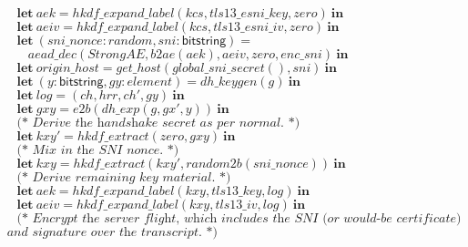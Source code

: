 \documentclass{article}
\theoremstyle{definition}
\newcommand{\kwl}[1]{\mathbf{#1}}
\newcommand{\kwt}[1]{\mathsf{#1}}
\newcommand{\var}[1]{\mathit{#1}}
\theoremstyle{definition}
\begin{document}
\begin{tabbing}
$\ \ \ \ \ \kwl{let}\ \var{aek} = \var{hkdf{\_}expand{\_}label}(\var{kcs}, \var{tls13{\_}esni{\_}key}, \var{zero})\ \kwl{in} $\\
$\ \ \ \ \ \kwl{let}\ \var{aeiv} = \var{hkdf{\_}expand{\_}label}(\var{kcs}, \var{tls13{\_}esni{\_}iv}, \var{zero})\ \kwl{in} $\\
$\ \ \ \ \ \kwl{let}\ (\var{sni{\_}nonce}{:}\var{random}, \var{sni}{:}\kwt{bitstring}) =  $\\
$\ \ \ \ \ \ \ \ \ \var{aead{\_}dec}(\var{StrongAE}, \var{b2ae}(\var{aek}), \var{aeiv}, \var{zero}, \var{enc{\_}sni})\ \kwl{in} $\\
$ $\\
$\ \ \ \ \ \kwl{let}\ \var{origin{\_}host} = \var{get{\_}host}(\var{global{\_}sni{\_}secret}(), \var{sni})\ \kwl{in} $\\
$ $\\
$\ \ \ \ \ \kwl{let}\ (\var{y}{:}\kwt{bitstring}, \var{gy}{:}\var{element}) = \var{dh{\_}keygen}(\var{g})\ \kwl{in} $\\
$\ \ \ \ \ \kwl{let}\ \var{log} = (\var{ch}, \var{hrr}, \var{ch'}, \var{gy})\ \kwl{in} $\\
$\ \ \ \ \ \kwl{let}\ \var{gxy} = \var{e2b}(\var{dh{\_}exp}(\var{g}, \var{gx'}, \var{y}))\ \kwl{in} $\\
$ $\\
$\ \ \ \ \ \textit{(* Derive the handshake secret as per normal. *)} $\\
$\ \ \ \ \ \kwl{let}\ \var{kxy'} = \var{hkdf{\_}extract}(\var{zero}, \var{gxy})\ \kwl{in} $\\
$ $\\
$\ \ \ \ \ \textit{(* Mix in the SNI nonce. *)} $\\
$\ \ \ \ \ \kwl{let}\ \var{kxy} = \var{hkdf{\_}extract}(\var{kxy'}, \var{random2b}(\var{sni{\_}nonce}))\ \kwl{in} $\\
$ $\\
$\ \ \ \ \ \textit{(* Derive remaining key material. *)} $\\
$\ \ \ \ \ \kwl{let}\ \var{aek} = \var{hkdf{\_}expand{\_}label}(\var{kxy}, \var{tls13{\_}key}, \var{log})\ \kwl{in} $\\
$\ \ \ \ \ \kwl{let}\ \var{aeiv} = \var{hkdf{\_}expand{\_}label}(\var{kxy}, \var{tls13{\_}iv}, \var{log})\ \kwl{in} $\\
$ $\\
$\ \ \ \ \ \textit{(* Encrypt the server flight, which includes the SNI (or would-be certificate) }$\\
$\textit{        and signature over the transcript. *)} $\\

\end{tabbing}
\end{document}

